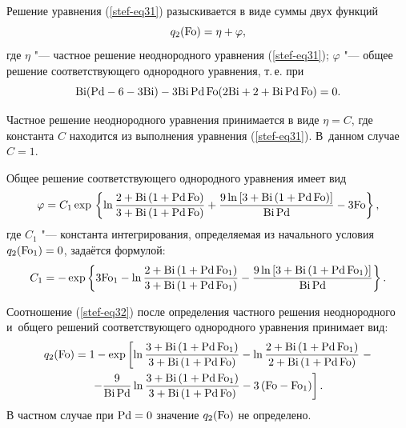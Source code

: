 Решение уравнения (\ref{stef-eq31}) разыскивается в виде суммы двух функций
\begin{equation}
\label{stef-eq32}
q_2 ({\rm Fo})=\eta +\varphi ,
\end{equation}
где $\eta $ "--- частное решение неоднородного уравнения (\ref{stef-eq31}); $\varphi $ "--- 
общее решение соответствующего однородного уравнения, т.\,е. при 
\[
{\rm Bi}({\rm Pd}-6-3{\rm Bi} )-3{\rm Bi}\,{\rm Pd}\,{\rm Fo}( 2{\rm Bi}+2+{\rm Bi}\,{\rm Pd}\,{\rm Fo})=0.
\]

Частное решение неоднородного уравнения принимается в виде $\eta =C$, где 
константа $C$ находится из выполнения уравнения (\ref{stef-eq31}). В~данном случае 
$C=1$. 

Общее решение соответствующего однородного уравнения имеет вид
\begin{equation}
\label{stef-eq33}
\varphi =C_1 \exp \,\left\{ {\ln \frac{2+{\rm Bi}\left( {1+{\rm Pd}\,{\rm Fo}} 
\right)}{3+{\rm Bi}\left( {1+{\rm Pd}\,{\rm Fo}} \right)}+\frac{9\ln \left[ {3+{\rm Bi}\left( {1+{\rm Pd}\,{\rm Fo}} 
\right)} \right]}{{\rm Bi}\,{\rm Pd}}-3{\rm Fo}} \right\},
\end{equation}
где $C_1 $ "--- константа интегрирования, определяемая из начального условия \linebreak
$q_2 ({\rm Fo}_1 )=0$, задаётся формулой:
\begin{equation}
\label{stef-eq34}
C_1 =-\exp\left\{ {3{\rm Fo}_1 -\ln \frac{2+{\rm Bi}\left( {1+{\rm Pd}\,{\rm Fo}_1 } 
\right)}{3+{\rm Bi}\left( {1+{\rm Pd}\,{\rm Fo}_1 } \right)}-\frac{9\ln \left[ {3+{\rm Bi}\left( 
{1+{\rm Pd}\,{\rm Fo}_1 } \right)} \right]}{{\rm Bi}\,{\rm Pd}}} \right\}.
\end{equation}


Соотношение (\ref{stef-eq32}) после определения частного решения неоднородного и~общего 
решений соответствующего однородного уравнения принимает вид:
\begin{multline}
q_2 ({\rm Fo})=1-\exp\left[ {\ln \frac{3+{\rm Bi}\left( {1+{\rm Pd}\,
{\rm Fo}_1 } \right)}{3+{\rm Bi}\left( {1+{\rm Pd}\, {\rm Fo}} \right)}-\ln \frac{2+{\rm Bi}\left( 
{1+{\rm Pd}\, {\rm Fo}_1 } \right)}{2+{\rm Bi}\left( {1+{\rm Pd}\, {\rm Fo}} \right)}} \right.-
\\
\label{stef-eq35}
\left. {-\frac{9}{{\rm Bi}\, {\rm Pd}}\ln \frac{3+{\rm Bi}\left( {1+{\rm Pd}\,{\rm Fo}_1 } 
\right)}{3+{\rm Bi}\left( {1+{\rm Pd}\, {\rm Fo}} \right)}-3\left( {{\rm Fo}-{\rm Fo}_1 } \right)} 
\right].
\end{multline}
В частном случае при ${\rm Pd}=0$ значение $q_2 ({\rm Fo})$ не определено.

